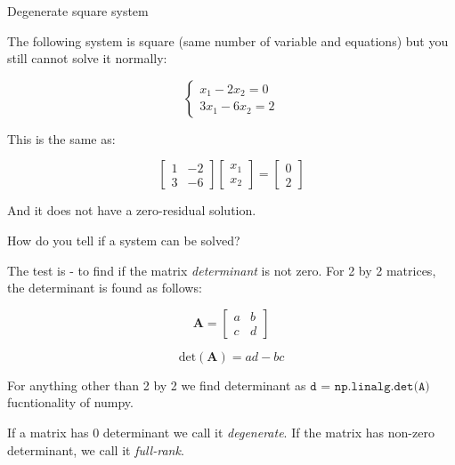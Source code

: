 \documentclass{beamer}
\begin{document}
\begin{frame}{Degenerate square system}
	\begin{flushleft}

The following system is square (same number of variable and equations) but you still cannot solve it normally:

\begin{equation}
	\begin{cases}
		x_1   - 2 x_2 = 0 \\
		3 x_1   - 6 x_2 = 2 
	\end{cases}
\end{equation}

This is the same as:

\begin{equation}
	\begin{bmatrix}
		1   & -2 \\
		3   & -6 
	\end{bmatrix}
	\begin{bmatrix}
		x_1  \\
		x_2 
	\end{bmatrix}
	=
	\begin{bmatrix}
		0 \\ 2
	\end{bmatrix}
\end{equation}

And it does not have a zero-residual solution.		
		
	\end{flushleft}
\end{frame}




\begin{frame}{How do you tell if a system can be solved?}
	\begin{flushleft}
		
		The test is - to find if the matrix \textit{determinant} is not zero. 	
		For 2 by 2 matrices, the determinant is found as follows:
		
		\begin{equation}
			\mathbf A =
			\begin{bmatrix}
				a   & b  \\
				c   & d  
			\end{bmatrix}
		\end{equation}
		
		\begin{equation}
			\text{det} (\mathbf A) =
			ad - bc
		\end{equation}
		
		\bigskip
		
		For anything other than 2 by 2 we find determinant as $\texttt{d = np.linalg.det(A)}$ fucntionality of numpy. 
		
		\bigskip
		
		If a matrix has 0 determinant we call it \textit{degenerate}. If the matrix has non-zero determinant, we call it \textit{full-rank}.
		
	\end{flushleft}
\end{frame}
\end{document}
